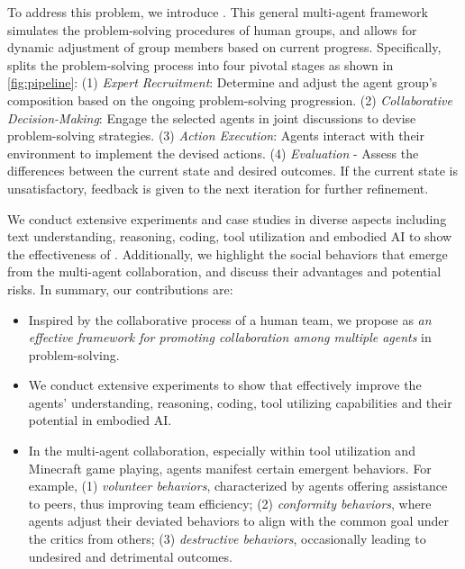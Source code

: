 

To address this problem, we introduce \framework. This general multi-agent framework simulates the problem-solving procedures of human groups, and allows for dynamic adjustment of group members based on current progress.
Specifically, \framework splits the problem-solving process into four pivotal stages as shown in \cref{fig:pipeline}:
(1) \textit{Expert Recruitment}: Determine and adjust the agent group's composition based on the ongoing problem-solving progression.
(2) \textit{Collaborative Decision-Making}: Engage the selected agents in joint discussions to devise problem-solving strategies. 
(3) \textit{Action Execution}: Agents interact with their environment to implement the devised actions.
(4) \textit{Evaluation} - Assess the differences between the current state and desired outcomes. If the current state is unsatisfactory, feedback is given to the next iteration for further refinement.


We conduct extensive experiments and case studies in diverse aspects including text understanding, reasoning, coding, tool utilization and embodied AI to show the effectiveness of \framework. Additionally, we highlight the social behaviors that emerge from the multi-agent collaboration, and discuss their advantages and potential risks. In summary, our contributions are:

\begin{itemize}[noitemsep,topsep=0pt,parsep=0pt,partopsep=0pt,leftmargin=2em]
    \item Inspired by the collaborative process of a human team, we propose \framework as \textit{an effective framework for promoting collaboration among multiple agents} in problem-solving.
    \item We conduct extensive experiments to show that \framework effectively improve the agents' understanding, reasoning, coding, tool utilizing capabilities and their potential in embodied AI.
    \item In the multi-agent collaboration, especially within tool utilization and Minecraft game playing, agents manifest certain emergent behaviors. For example, (1) \textit{volunteer behaviors}, characterized by agents offering assistance to peers, thus improving team efficiency; (2) \textit{conformity behaviors}, where agents adjust their deviated behaviors to align with the common goal under the critics from others; (3) \textit{destructive behaviors}, occasionally leading to undesired and detrimental outcomes. 
\end{itemize}


